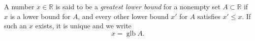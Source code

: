 A number $x \in \mathbb{R}$ is said to be a \textit{greatest lower bound} for a nonempty set $A \subset \mathbb{R}$ if $x$ is a lower bound for $A$, and every other lower bound $x'$ for $A$ satisfies $x' \leq x$. If such an $x$ exists, it is unique and we write
\begin{equation*}
x = \operatorname{glb} A.
\end{equation*}
